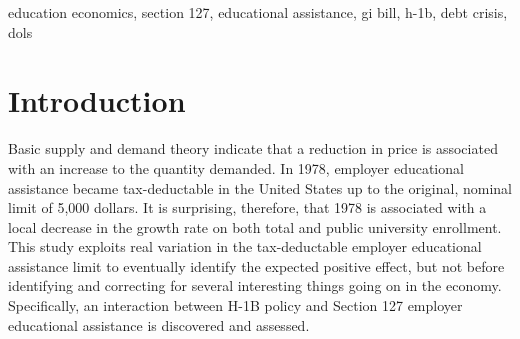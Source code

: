 \documentclass[review]{elsarticle}
\begin{document}
\begin{frontmatter}
\begin{abstract}
\end{abstract}

\begin{keyword}
education economics, section 127, educational assistance, gi bill, h-1b, debt crisis, dols
\MSC[2010] %
\end{keyword}

\end{frontmatter}

\pagebreak
\linenumbers
        
    \section{Introduction}

    Basic supply and demand theory indicate that a reduction in price is associated with an increase to the quantity demanded.
    In 1978, employer educational assistance became tax-deductable in the United States up to the original, nominal limit of 5,000 dollars.
    It is surprising, therefore, that 1978 is associated with a local decrease in the growth rate on both total and public university enrollment.
    This study exploits real variation in the tax-deductable employer educational assistance limit to eventually identify the expected positive effect,
    but not before identifying and correcting for several interesting things going on in the economy.
    Specifically, an interaction between H-1B policy and Section 127 employer educational assistance is discovered and assessed.
\end{document}
